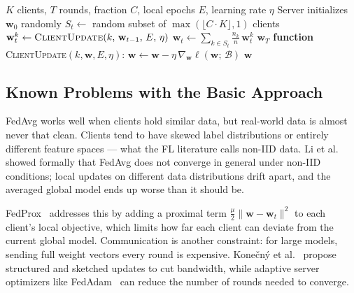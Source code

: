 \documentclass[conference]{IEEEtran}
\begin{document}
\begin{algorithm}[t]
  \caption{FedAvg~\cite{mcmahan2017communication}}
  \label{alg:fedavg}
  \begin{algorithmic}[1]
    \REQUIRE $K$ clients, $T$ rounds, fraction $C$, local epochs $E$,
             learning rate $\eta$
    \STATE Server initializes $\mathbf{w}_0$ randomly
      \STATE $S_t \leftarrow$ random subset of $\max(\lfloor C \cdot K \rfloor, 1)$
             clients
        \STATE $\mathbf{w}_{t}^{k} \leftarrow
               \textsc{ClientUpdate}(k,\, \mathbf{w}_{t-1},\, E,\, \eta)$
      \ENDFOR
      \STATE $\mathbf{w}_{t} \leftarrow
             \sum_{k \in S_t} \tfrac{n_k}{n}\, \mathbf{w}_{t}^{k}$
    \ENDFOR
    \RETURN $\mathbf{w}_T$
    \STATE \hspace{-1.4em}\textbf{function} \textsc{ClientUpdate}$(k, \mathbf{w}, E, \eta)$:
      \STATE $\mathbf{w} \leftarrow \mathbf{w} - \eta \,
             \nabla_{\mathbf{w}} \ell(\mathbf{w};\, \mathcal{B})$
    \ENDFOR
    \RETURN $\mathbf{w}$
  \end{algorithmic}
\end{algorithm}

\subsection{Known Problems with the Basic Approach}

FedAvg works well when clients hold similar data, but real-world data
is almost never that clean.
Clients tend to have skewed label distributions or entirely different
feature spaces --- what the FL literature calls non-IID data.
Li et al.~\cite{li2020convergence} showed formally that FedAvg does not
converge in general under non-IID conditions; local updates on different
data distributions drift apart, and the averaged global model ends up
worse than it should be.

FedProx~\cite{li2020fedprox} addresses this by adding a proximal term
$\frac{\mu}{2}\|\mathbf{w} - \mathbf{w}_t\|^2$ to each client's local
objective, which limits how far each client can deviate from the current
global model.
Communication is another constraint: for large models, sending full
weight vectors every round is expensive.
Kone\v{c}n\'{y} et al.~\cite{konecny2016strategies} propose structured
and sketched updates to cut bandwidth, while adaptive server
optimizers like FedAdam~\cite{reddi2021adaptive} can reduce the number
of rounds needed to converge.
\end{document}
